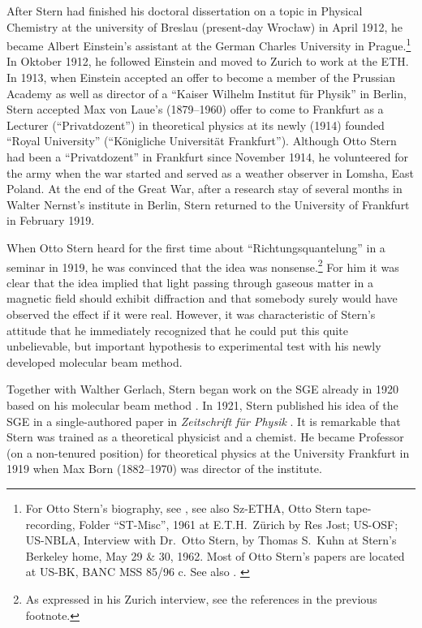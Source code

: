 \documentclass{article}
\begin{document}
After Stern had finished his doctoral dissertation on a topic in Physical Chemistry at the university of Breslau (present-day Wroc\l{}aw) in April 1912, he became Albert Einstein's assistant at the German Charles University in Prague.\footnote{For Otto Stern's biography, see  \citep{SchmidtBoeckingHEtal2011Stern,ToenniesJEtal2011Stern}, see also Sz-ETHA, Otto Stern tape-recording, Folder ``ST-Misc'', 1961 at E.T.H.\ Z\"urich by Res Jost; US-OSF; US-NBLA, Interview with Dr.~Otto Stern, by Thomas S.~Kuhn at Stern's Berkeley home, May 29 \& 30, 1962. Most of Otto Stern's papers are located at US-BK, BANC MSS 85/96 c.
See also \citep{FriedrichBEtal1998Star}.
\label{note:stern_bio}} In Oktober 1912, he followed Einstein and moved to Zurich to work at the ETH. In 1913, when Einstein accepted an offer to become a member of the Prussian Academy as well as director of a ``Kaiser Wilhelm Institut für Physik'' in Berlin, Stern accepted Max von Laue's (1879--1960) offer to come to Frankfurt as a Lecturer (``Privatdozent'') in theoretical physics at its newly (1914) founded “Royal University” (``Königliche Universität Frankfurt''). Although Otto Stern had been a ``Privatdozent'' in Frankfurt since November 1914, he volunteered for the army when the war started and served as a weather observer in Lomsha, East Poland. At the end of the Great War, after a research stay of several months in Walter Nernst's institute in Berlin, Stern returned to the University of Frankfurt in February 1919. 

When Otto Stern heard for the first time about ``Richtungsquantelung'' in a seminar in 1919, he was convinced that the idea was nonsense.\footnote{As expressed in his Zurich interview, see the references in the previous footnote.} For him it was clear that the idea implied that light passing through gaseous matter in a magnetic field should exhibit diffraction and that somebody surely would have observed the effect if it were real. However, it was characteristic of Stern's attitude that he immediately recognized that he could put this quite unbelievable, but important hypothesis to experimental test with his newly developed molecular beam method.  

Together with Walther Gerlach, Stern began work on the SGE already in 1920 based on his molecular beam method \citep{SternO1920Messung,SternO1920Messung2,SternO1920Nachtrag}. In 1921, Stern published his idea of the SGE in a single-authored paper in \emph{Zeitschrift für Physik} \citep{SternO1921Weg}. It is remarkable that Stern was trained as a theoretical physicist and a chemist. He became Professor (on a non-tenured position) for theoretical physics at the University Frankfurt in 1919 when Max Born (1882--1970) was director of the institute. 
\end{document}
